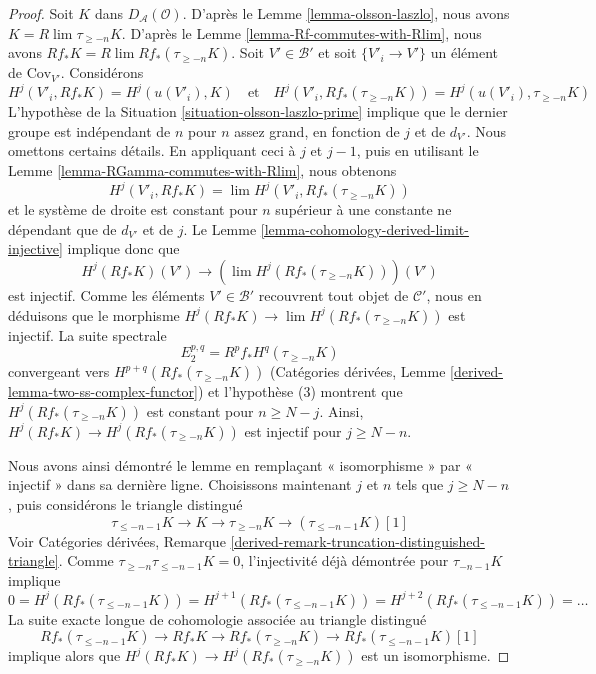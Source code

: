 \begin{proof}
Soit $K$ dans $D_\mathcal{A}(\mathcal{O})$. D'après le Lemme
\ref{lemma-olsson-laszlo}, nous avons
$K = R\lim \tau_{\geq -n}K$. D'après le Lemme
\ref{lemma-Rf-commutes-with-Rlim}, nous avons
$Rf_*K = R\lim Rf_*(\tau_{\geq -n}K)$. Soit $V' \in \mathcal{B}'$ et soit
$\{V'_i \to V'\}$ un élément de $\text{Cov}_{V'}$. Considérons
$$
H^j(V'_i, Rf_*K) = H^j(u(V'_i), K)
\quad\text{et}\quad
H^j(V'_i, Rf_*(\tau_{\geq -n}K)) = H^j(u(V'_i), \tau_{\geq -n}K)
$$
L'hypothèse de la Situation \ref{situation-olsson-laszlo-prime} implique
que le dernier groupe est indépendant de $n$ pour $n$ assez grand, en
fonction de $j$ et de $d_{V'}$. Nous omettons certains détails. En
appliquant ceci à $j$ et $j - 1$, puis en utilisant le Lemme
\ref{lemma-RGamma-commutes-with-Rlim}, nous obtenons
$$
H^j(V'_i, Rf_*K) = \lim H^j(V'_i, Rf_*(\tau_{\geq -n} K))
$$
et le système de droite est constant pour $n$ supérieur à une constante ne
dépendant que de $d_{V'}$ et de $j$. Le Lemme
\ref{lemma-cohomology-derived-limit-injective} implique donc que
$$
H^j(Rf_*K)(V') \longrightarrow
\left(\lim H^j(Rf_*(\tau_{\geq -n}K))\right)(V')
$$
est injectif. Comme les éléments $V' \in \mathcal{B}'$ recouvrent tout
objet de $\mathcal{C}'$, nous en déduisons que le morphisme
$H^j(Rf_*K) \to \lim H^j(Rf_*(\tau_{\geq -n}K))$ est injectif. La suite
spectrale
$$
E_2^{p, q} = R^pf_*H^q(\tau_{\geq -n}K)
$$
convergeant vers $H^{p + q}(Rf_*(\tau_{\geq -n}K))$ (Catégories dérivées,
Lemme \ref{derived-lemma-two-ss-complex-functor}) et l'hypothèse (3)
montrent que $H^j(Rf_*(\tau_{\geq -n}K))$ est constant pour
$n \geq N - j$. Ainsi,
$H^j(Rf_*K) \to H^j(Rf_*(\tau_{\geq -n}K))$ est injectif pour
$j \geq N - n$.

\medskip\noindent
Nous avons ainsi démontré le lemme en remplaçant « isomorphisme » par
« injectif » dans sa dernière ligne. Choisissons maintenant $j$ et $n$
tels que $j \geq N - n$, puis considérons le triangle distingué
$$
\tau_{\leq -n - 1}K \to K \to \tau_{\geq -n}K \to (\tau_{\leq -n - 1}K)[1]
$$
Voir Catégories dérivées, Remarque
\ref{derived-remark-truncation-distinguished-triangle}.
Comme $\tau_{\geq -n}\tau_{\leq -n -1}K = 0$, l'injectivité déjà démontrée
pour $\tau_{-n - 1}K$ implique
$$
0 = H^j(Rf_*(\tau_{\leq -n - 1}K)) =
H^{j + 1}(Rf_*(\tau_{\leq -n - 1}K)) =
H^{j + 2}(Rf_*(\tau_{\leq -n - 1}K)) = \ldots
$$
La suite exacte longue de cohomologie associée au triangle distingué
$$
Rf_*(\tau_{\leq -n - 1}K) \to Rf_*K \to Rf_*(\tau_{\geq -n}K) \to
Rf_*(\tau_{\leq -n - 1}K)[1]
$$
implique alors que $H^j(Rf_*K) \to H^j(Rf_*(\tau_{\geq -n}K))$ est un
isomorphisme.
\end{proof}








